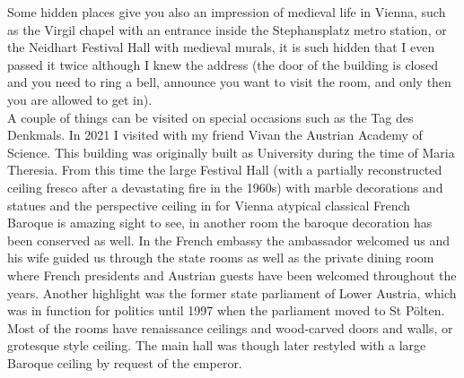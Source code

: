 Some hidden places give you also an impression of medieval life in Vienna, such as the Virgil chapel with an entrance inside the Stephansplatz metro station, or the Neidhart Festival Hall with medieval murals, it is such hidden that I even passed it twice although I knew the address (the door of the building is closed and you need to ring a bell, announce you want to visit the room, and only then you are allowed to get in).\\
A couple of things can be visited on special occasions such as the Tag des Denkmals. In 2021 I visited with my friend Vivan the Austrian Academy of Science. This building was originally built as University during the time of Maria Theresia. From this time the large Festival Hall (with a partially reconstructed ceiling fresco after a devastating fire in the 1960s) with marble decorations and statues and the perspective ceiling in for Vienna atypical classical French Baroque is amazing sight to see, in another room the baroque decoration has been conserved as well. In the French embassy the ambassador welcomed us and his wife guided us through the state rooms as well as the private dining room where French presidents and Austrian guests have been welcomed throughout the years. Another highlight was the former state parliament of Lower Austria, which was in function for politics until 1997 when the parliament moved to St P\"olten. Most of the rooms have renaissance ceilings and wood-carved doors and walls, or grotesque style ceiling. The main hall was though later restyled with a large Baroque ceiling by request of the emperor.\\

